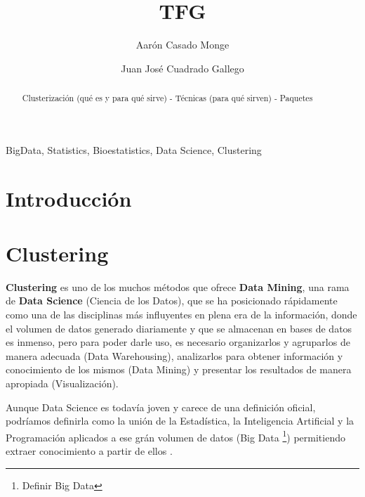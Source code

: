 \documentclass[3p,twocolumn]{elsarticle}
\begin{document}
\title{TFG} %

\author[1]{Aarón Casado Monge} %

\author[2]{Juan José Cuadrado Gallego} %

\address{University of Alcala, Polytechnic School, Computer Science Department, Scientific and Technological Campus, Politechnic Building. Office: O243, 28805, Alcala de Henares, Madrid, Spain}

\begin{abstract}
Clusterización (qué es y para qué sirve) - Técnicas (para qué sirven) - Paquetes 
\end{abstract}

\begin{keyword}
BigData, Statistics, Bioestatistics, Data Science, Clustering
\end{keyword}

\maketitle %
 
\section{Introducción}


\section{Clustering} 

\textbf{Clustering} es uno de los muchos métodos que ofrece \textbf{Data Mining}, una rama de \textbf{Data Science} (Ciencia de los Datos), que se ha posicionado rápidamente como una de las disciplinas más influyentes en plena era de la información, donde el volumen de datos generado diariamente y que se almacenan en bases de datos es inmenso, pero para poder darle uso, es necesario organizarlos y agruparlos de manera adecuada (Data Warehousing), analizarlos para obtener información y conocimiento de los mismos (Data Mining) y presentar los resultados de manera apropiada (Visualización). 

Aunque Data Science es todavía joven y carece de una definición oficial, podríamos definirla como la unión de la Estadística, la Inteligencia Artificial y la Programación aplicados a ese grán volumen de datos (Big Data \footnote{Definir Big Data}) permitiendo extraer conocimiento a partir de ellos \cite{cita4}.
\end{document}
